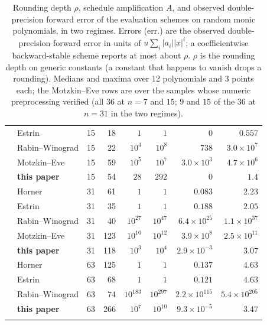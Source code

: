 \begin{table}[htbp]
\begin{tabular}{@{}llrrrrrr@{}}
 & Estrin & 15 & 18 & $1$ & $1$ & $0$ & $0.557$ \\
 & Rabin--Winograd & 15 & 22 & $10^{4}$ & $10^{8}$ & $738$ & $3.0\times10^{7}$ \\
 & Motzkin--Eve & 15 & 59 & $10^{5}$ & $10^{7}$ & $3.0\times10^{3}$ & $4.7\times10^{6}$ \\
 & \textbf{this paper} & 15 & 54 & $28$ & $292$ & $0$ & $1.4$ \\
\addlinespace[2pt]
 & Horner & 31 & 61 & $1$ & $1$ & $0.083$ & $2.23$ \\
 & Estrin & 31 & 35 & $1$ & $1$ & $0.188$ & $2.05$ \\
 & Rabin--Winograd & 31 & 40 & $10^{27}$ & $10^{47}$ & $6.4\times10^{25}$ & $1.1\times10^{37}$ \\
 & Motzkin--Eve & 31 & 123 & $10^{10}$ & $10^{12}$ & $3.9\times10^{8}$ & $2.5\times10^{11}$ \\
 & \textbf{this paper} & 31 & 118 & $10^{3}$ & $10^{4}$ & $2.9\times10^{-3}$ & $3.07$ \\
\addlinespace[2pt]
 & Horner & 63 & 125 & $1$ & $1$ & $0.137$ & $4.63$ \\
 & Estrin & 63 & 68 & $1$ & $1$ & $0.121$ & $4.63$ \\
 & Rabin--Winograd & 63 & 74 & $10^{183}$ & $10^{297}$ & $2.2\times10^{115}$ & $5.4\times10^{205}$ \\
 & \textbf{this paper} & 63 & 266 & $10^{7}$ & $10^{10}$ & $9.3\times10^{-5}$ & $3.47$ \\
\addlinespace[2pt]
\bottomrule
\end{tabular}
\caption{Rounding depth $\rho$, schedule amplification $A$, and observed double-precision forward error of the evaluation schemes on random monic polynomials, in two regimes. Errors (err.) are the observed double-precision forward error in units of $u\sum_i|a_i||x|^i$; a coefficientwise backward-stable scheme reports at most about $\rho$. $\rho$ is the rounding depth on generic constants (a constant that happens to vanish drops a rounding). Medians and maxima over 12 polynomials and 3 points each; the Motzkin--Eve rows are over the samples whose numeric preprocessing verified (all $36$ at $n=7$ and $15$; $9$ and $15$ of the $36$ at $n=31$ in the two regimes).}
\label{tab:numstab}
\end{table}
